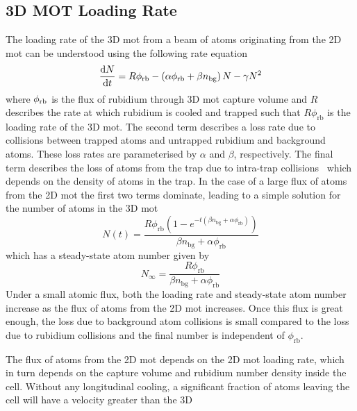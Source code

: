 \subsection{3D MOT Loading Rate}\label{subsec:loading_rate}
The loading rate of the 3D \ac{mot} from a beam of atoms originating from the 2D
\ac{mot} can be understood using the following rate equation
\begin{equation}
	\frac{\mathrm{d} N}{\mathrm{d}t} = R  \phi_\textnormal{rb} - \left(\alpha \phi_\textnormal{rb}  + \beta n_\textnormal{bg} \right) N - \gamma N^2
	\label{eq:loading_rate}
\end{equation}
where \(\phi_\textnormal{rb}\) is the flux of rubidium through 3D \ac{mot}
capture volume and \(R\) describes the rate at which rubidium is cooled and
trapped such that \( R \phi_\text{rb}\) is the loading rate of the 3D \ac{mot}.
The second term describes a loss rate due to collisions between trapped atoms
and untrapped rubidium and background atoms. These loss rates are parameterised
by \(\alpha\) and \(\beta\), respectively. The final term describes the loss of
atoms from the trap due to intra-trap collisions~\cite{Prentiss1988} which
depends on the density of atoms in the trap. In the case of a large flux of
atoms from the 2D \ac{mot} the first two terms dominate, leading to a simple
solution for the number of atoms in the 3D \ac{mot}
\begin{equation}
	N(t) = \frac{R \phi _{\text{rb}} \left(1-e^{-t \left(\beta  n_{\text{bg}}+\alpha  \phi _{\text{rb}}\right)}\right)}{\beta  n_{\text{bg}}+\alpha  \phi _{\text{rb}}}
	\label{eq:atom_number}
\end{equation}
which has a steady-state atom number given by
\begin{equation}
	N_\infty = \frac{R \phi _{\text{rb}}}{\beta  n_{\text{bg}}+\alpha  \phi _{\text{rb}}}
\end{equation}
Under a small atomic flux, both the loading rate and steady-state atom number
increase as the flux of atoms from the 2D \ac{mot} increases. Once this flux is
great enough, the loss due to background atom collisions is small compared to
the loss due to rubidium collisions and the final number is independent of
\(\phi_\text{rb}\). \par\noindent The flux of atoms from the 2D \ac{mot} depends on the 2D
\ac{mot} loading rate, which in turn depends on the capture volume and rubidium
number density inside the cell.  Without any longitudinal cooling, a significant
fraction of atoms leaving the cell will have a velocity greater than the 3D
